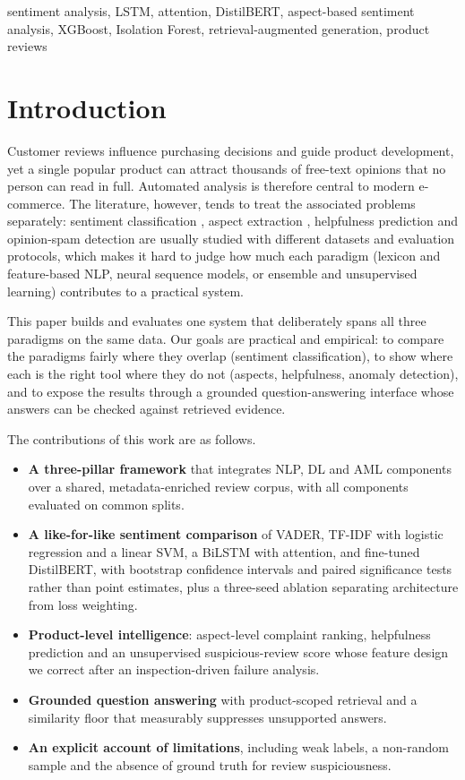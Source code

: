 \documentclass[conference]{IEEEtran}
\begin{document}
\begin{IEEEkeywords}
sentiment analysis, LSTM, attention, DistilBERT, aspect-based sentiment analysis, XGBoost, Isolation Forest, retrieval-augmented generation, product reviews
\end{IEEEkeywords}

\section{Introduction}
Customer reviews influence purchasing decisions and guide product development, yet a single popular product can attract thousands of free-text opinions that no person can read in full. Automated analysis is therefore central to modern e-commerce. The literature, however, tends to treat the associated problems separately: sentiment classification \cite{pang2002thumbs,liu2012sentiment}, aspect extraction \cite{hu2004mining}, helpfulness prediction \cite{kim2006automatically} and opinion-spam detection \cite{jindal2008opinion} are usually studied with different datasets and evaluation protocols, which makes it hard to judge how much each paradigm (lexicon and feature-based NLP, neural sequence models, or ensemble and unsupervised learning) contributes to a practical system.

This paper builds and evaluates one system that deliberately spans all three paradigms on the same data. Our goals are practical and empirical: to compare the paradigms fairly where they overlap (sentiment classification), to show where each is the right tool where they do not (aspects, helpfulness, anomaly detection), and to expose the results through a grounded question-answering interface whose answers can be checked against retrieved evidence.

The contributions of this work are as follows.
\begin{itemize}
\item \textbf{A three-pillar framework} that integrates NLP, DL and AML components over a shared, metadata-enriched review corpus, with all components evaluated on common splits.
\item \textbf{A like-for-like sentiment comparison} of VADER, TF-IDF with logistic regression and a linear SVM, a BiLSTM with attention, and fine-tuned DistilBERT, with bootstrap confidence intervals and paired significance tests rather than point estimates, plus a three-seed ablation separating architecture from loss weighting.
\item \textbf{Product-level intelligence}: aspect-level complaint ranking, helpfulness prediction and an unsupervised suspicious-review score whose feature design we correct after an inspection-driven failure analysis.
\item \textbf{Grounded question answering} with product-scoped retrieval and a similarity floor that measurably suppresses unsupported answers.
\item \textbf{An explicit account of limitations}, including weak labels, a non-random sample and the absence of ground truth for review suspiciousness.
\end{itemize}
\end{document}
